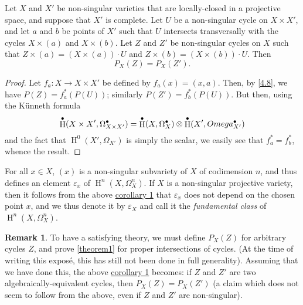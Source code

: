 \documentclass{article}
\theoremstyle{plain}
\newenvironment{corollary}[1]
  {\renewcommand\theinnercustomcorollary{#1}\innercustomcorollary}
  {\endinnercustomcorollary}
\theoremstyle{definition}
\newtheorem*{remark}{Remark}
\DeclareMathOperator{\HH}{H}
\newcommand{\oldpage}[1]{\marginpar{\footnotesize$\Big\vert$ \textit{p.~#1}}}
\begin{document}
\oldpage{149-13}
\begin{corollary}{1}
\label{theorem1corollary1}
  Let $X$ and $X'$ be non-singular varieties that are locally-closed in a projective space, and suppose that $X'$ is complete.
  Let $U$ be a non-singular cycle on $X\times X'$, and let $a$ and $b$ be points of $X'$ such that $U$ intersects transversally with the cycles $X\times(a)$ and $X\times(b)$.
  Let $Z$ and $Z'$ be non-singular cycles on $X$ such that $Z\times(a)=(X\times(a))\cdot U$ and $Z\times(b)=(X\times(b))\cdot U$.
  Then
  \[
    P_X(Z) = P_X(Z').
  \]
\end{corollary}

\begin{proof}
  Let $f_a\colon X\to X\times X'$ be defined by $f_a(x)=(x,a)$.
  Then, by \cref{4.8}, we have $P(Z)=f_a^*(P(U))$; similarly $P(Z')=f_b^*(P(U))$.
  But then, using the K\"{u}nneth formula
  \[
    \HH^\bullet(X\times X',\Omega_{X\times X'}^\bullet)
    = \HH^\bullet(X,\Omega_X^\bullet)\otimes\HH^\bullet(X',\\Omega_{X'}^\bullet)
  \]
  and the fact that $\HH^0(X',\Omega_{X'})$ is simply the scalar, we easily see that $f_a^*=f_b^*$, whence the result.
\end{proof}

For all $x\in X$, $(x)$ is a non-singular subvariety of $X$ of codimension $n$, and thus defines an element $\varepsilon_x$ of $\HH^n(X,\Omega_X^n)$.
If $X$ is a non-singular projective variety, then it follows from the above \hyperref[theorem1corollary1]{corollary 1} that $\varepsilon_x$ does not depend on the chosen point $x$, and we thus denote it by $\varepsilon_X$ and call it the \emph{fundamental class} of $\HH^n(X,\Omega_X^n)$.

\begin{remark}
\label{section4remark}
  To have a satisfying theory, we must define $P_X(Z)$ for arbitrary cycles $Z$, and prove \cref{theorem1} for proper intersections of cycles.
  (At the time of writing this expos\'{e}, this has still not been done in full generality).
  Assuming that we have done this, the above \hyperref[theorem1corollary1]{corollary 1} becomes: if $Z$ and $Z'$ are two algebraically-equivalent cycles, then $P_X(Z)=P_X(Z')$ (a claim which does not seem to follow from the above, even if $Z$ and $Z'$ are non-singular).
\end{remark}
\end{document}
